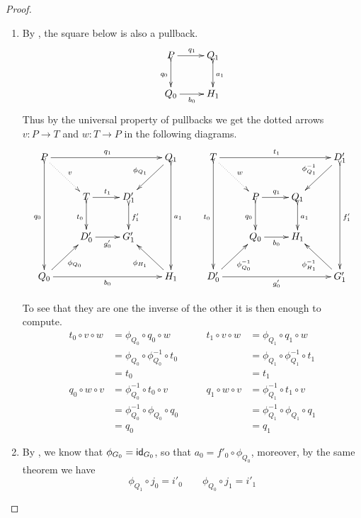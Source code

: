 \begin{proof}
	\begin{enumerate}
		\item  By , the square below is also a pullback.
			\[\xymatrix{P \ar[r]^{q_1} \ar@{>->}[d]_{q_0} & Q_1 \ar@{>->}[d]^{a_1}\\ Q_0 \ar[r]_{b_0} & H_1}\]
			Thus by the universal property of pullbacks  we get the dotted arrows $v\colon P\to T$ and $w\colon T\to P$ in the following diagrams.
		\[\xymatrix{ P \ar@{.>}[dr]^{v} \ar[rrr]^{q_1} \ar@{>->}[ddd]_{q_0}&&& Q_1 \ar@{>->}[ddd]^{a_1} \ar[dl]_{\phi_{Q_1}}& T\ar@{.>}[dr]^{w}  \ar[rrr]^{t_1} \ar@{>->}[ddd]_{t_0}&&& D'_1 \ar[dl]_{\phi^{-1}_{Q_1}} \ar@{>->}[ddd]^{f'_1}\\&T \ar@{>->}[d]_{t_0}\ar[r]^{t_1}& D'_1 \ar@{>->}[d]^{f'_1} &&& P \ar@{>->}[d]_{q_0}\ar[r]^{q_1}& Q_1\ar@{>->}[d]^{a_1}\\ & D'_0\ar[r]_{g'_0} & G'_1 &&& Q_0 \ar[r]_{b_0}& H_1 \\Q_0 \ar[rrr]_{b_0} \ar[ur]_{\phi_{Q_0}}&&& H_1 \ar[ul]^{\phi_{H_1}} & D'_0 \ar[rrr]_{g'_0} \ar[ur]_{\phi^{-1}_{Q_0}}&&&G'_1 \ar[ul]^{\phi^{-1}_{H_1}}}\]

To see that they are one the inverse of the other it is then enough to compute.
		\[\begin{split}
		t_0\circ v\circ w &=\phi_{Q_0}\circ q_0\circ w\\&=\phi_{Q_0}\circ \phi^{-1}_{Q_0} \circ t_0\\&=t_0\\q_0\circ w\circ v&=\phi^{-1}_{Q_0}	\circ t_0\circ v\\&=\phi^{-1}_{Q_0} \circ \phi_{Q_0}\circ q_0\\&=q_0 	\end{split}\qquad \begin{split}
		t_1\circ v\circ w &=\phi_{Q_1}\circ q_1\circ w\\&=\phi_{Q_1}\circ \phi^{-1}_{Q_1} \circ t_1\\&=t_1\\q_1\circ w\circ v&=\phi^{-1}_{Q_1}	\circ t_1\circ v\\&=\phi^{-1}_{Q_1} \circ \phi_{Q_1}\circ q_1\\&=q_1
		\end{split}\]
		
	\item By , we know that $\phi_{G_0}=\mathsf{id}_{G_0}$, so that $a_0=f'_0\circ \phi_{Q_0}$, moreover, by the same theorem we have 
	\[\phi_{Q_1}\circ j_0=i'_0 \qquad  \phi_{Q_0}\circ j_1=i'_1\] 
		

\end{enumerate}
\end{proof}
